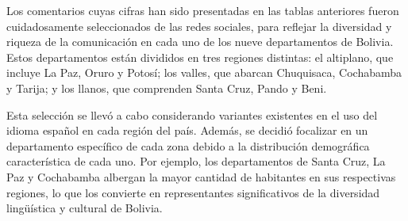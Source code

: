 Los comentarios cuyas cifras han sido presentadas en las tablas anteriores fueron cuidadosamente seleccionados de las redes sociales, para reflejar la diversidad y riqueza de la comunicación en cada uno de los nueve departamentos de Bolivia. Estos departamentos están divididos en tres regiones distintas: el altiplano, que incluye La Paz, Oruro y Potosí; los valles, que abarcan Chuquisaca, Cochabamba y Tarija; y los llanos, que comprenden Santa Cruz, Pando y Beni.

Esta selección se llevó a cabo considerando variantes existentes en el uso del idioma español en cada región del país. Además, se decidió focalizar en un departamento específico de cada zona debido a la distribución demográfica característica de cada uno. Por ejemplo, los departamentos de Santa Cruz, La Paz y Cochabamba albergan la mayor cantidad de habitantes en sus respectivas regiones, lo que los convierte en representantes significativos de la diversidad lingüística y cultural de Bolivia.


